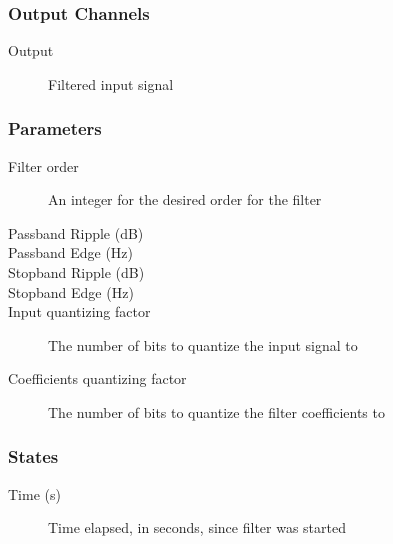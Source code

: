 \subsubsection{Output Channels}
\begin{description}
\item [Output]Filtered input signal
\end{description}

\subsubsection{Parameters}
\begin{description}
\item [Filter order]An integer for the desired order for the filter
\item [Passband Ripple (dB)]
\item [Passband Edge (Hz)]
\item [Stopband Ripple (dB)]
\item [Stopband Edge (Hz)]
\item [Input quantizing factor]The number of bits to quantize the input signal to
\item [Coefficients quantizing factor]The number of bits to quantize the filter coefficients to
\end{description}

\subsubsection{States}
\begin{description}
\item [Time (s)] Time elapsed, in seconds, since filter was started
\end{description}